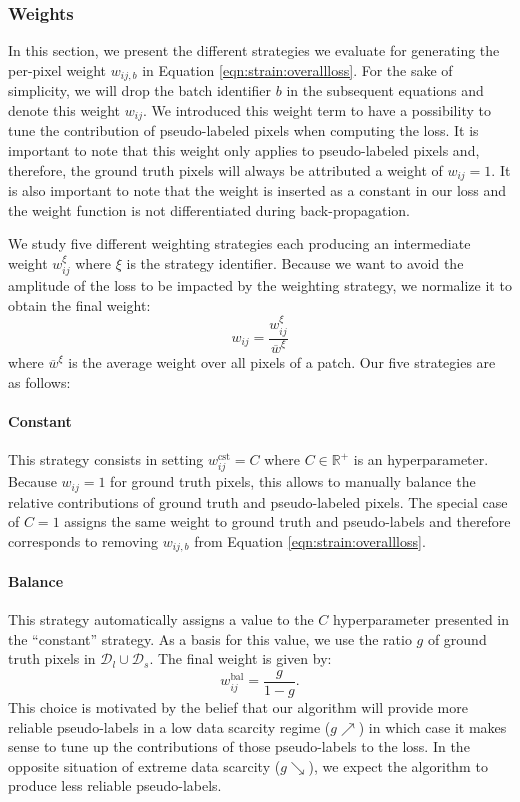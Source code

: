 \subsubsection{Weights}
\label{sssec:strain:weights}
In this section, we present the different strategies we evaluate for generating the per-pixel weight $w_{ij,b}$ in Equation \ref{eqn:strain:overallloss}. For the sake of simplicity, we will drop the batch identifier $b$ in the subsequent equations and denote this weight $w_{ij}$. We introduced this weight term to have a possibility to tune the contribution of pseudo-labeled pixels when computing the loss. It is important to note that this weight only applies to pseudo-labeled pixels and, therefore, the ground truth pixels will always be attributed a weight of $w_{ij} = 1$. It is also important to note that the weight is inserted as a constant in our loss and the weight function is not differentiated during back-propagation. 

We study five different weighting strategies each producing an intermediate weight $w^{\xi}_{ij}$ where $\xi$ is the strategy identifier. Because we want to avoid the amplitude of the loss to be impacted by the weighting strategy, we normalize it to obtain the final weight:
\begin{equation}
w_{ij} = \dfrac{w^{\xi}_{ij}}{\overline{w}^{\xi}}
\end{equation}
where $\overline{w}^{\xi}$ is the average weight over all pixels of a patch. Our five strategies are as follows:

\paragraph{Constant} This strategy consists in setting $w^{\text{cst}}_{ij} = C$ where $C \in \mathbb{R}^+$ is an hyperparameter. Because $w_{ij} = 1$ for ground truth pixels, this allows to manually balance the relative contributions of ground truth and pseudo-labeled pixels. The special case of $C = 1$ assigns the same weight to ground truth and pseudo-labels and therefore corresponds to removing $w_{ij,b}$ from Equation \ref{eqn:strain:overallloss}.

\paragraph{Balance} This strategy automatically assigns a value to the $C$ hyperparameter presented in the ``constant'' strategy. As a basis for this value, we use the ratio $g$ of ground truth pixels in $\mathcal{D}_l \cup \mathcal{D}_s$. The final weight is given by: 
\begin{equation}
w^{\text{bal}}_{ij} = \frac{g}{1 - g}.
\label{eqn:strain:balancegt}
\end{equation}
This choice is motivated by the belief that our algorithm will provide more reliable pseudo-labels in a low data scarcity regime ($g \nearrow $) in which case it makes sense to tune up the contributions of those pseudo-labels to the loss. In the opposite situation of extreme data scarcity ($g \searrow $), we expect the algorithm to produce less reliable pseudo-labels. 


